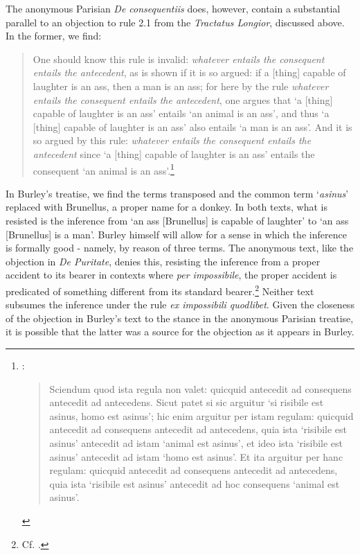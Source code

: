 \documentclass[]{birkjour}
\begin{document}
The anonymous Parisian \textit{De consequentiis} does, however, contain a substantial parallel to an objection to rule 2.1 from the \textit{Tractatus Longior}, discussed above. In the former, we find: 
\begin{quote}
	One should know this rule is invalid: \textit{whatever entails the consequent entails the antecedent}, as is shown if it is so argued: if a [thing] capable of laughter is an ass, then a man is an ass; for here by the rule \textit{whatever entails the consequent entails the antecedent}, one argues that `a [thing] capable of laughter is an ass' entails `an animal is an ass', and thus `a [thing] capable of laughter is an ass' also entails `a man is an ass'. And it is so argued by this rule: \textit{whatever entails the consequent entails the antecedent} since `a [thing] capable of laughter is an ass' entails the consequent `an animal is an ass'.\footnote{\autocite[p. 16, par. 21]{Green-Pedersen1980a}: \begin{quote}
			Sciendum quod ista regula non valet: quicquid antecedit ad consequens antecedit ad antecedens. Sicut patet si sic arguitur `si risibile est asinus, homo est asinus'; hic enim arguitur per istam regulam: quicquid antecedit ad consequens antecedit ad antecedens, quia ista `risibile est asinus' antecedit ad istam `animal est asinus', et ideo ista `risibile est asinus' antecedit ad istam `homo est asinus'. Et ita arguitur per hanc regulam: quicquid antecedit ad consequens antecedit ad antecedens, quia ista `risibile est asinus' antecedit ad hoc consequens `animal est asinus'.
		\end{quote}}
\end{quote}
In Burley's treatise, we find the terms transposed and the common term `\textit{asinus}' replaced with Brunellus, a proper name for a donkey. In both texts, what is resisted is the inference from `an ass [Brunellus] is capable of laughter' to `an ass [Brunellus] is a man'. Burley himself will allow for a sense in which the inference is formally good - namely, by reason of three terms. The anonymous text, like the objection in \textit{De Puritate}, denies this, resisting the inference from a proper accident to its bearer in contexts where \textit{per impossibile}, the proper accident is predicated of something different from its standard bearer.\footnote{Cf. \autocite[q. 11, par. 19]{ScotusQE}.} Neither text subsumes the inference under the rule \textit{ex impossibili quodlibet}. Given the closeness of the objection in Burley's text to the stance in the anonymous Parisian treatise, it is possible that the latter was a source for the objection as it appears in Burley.	
	
\end{document}
